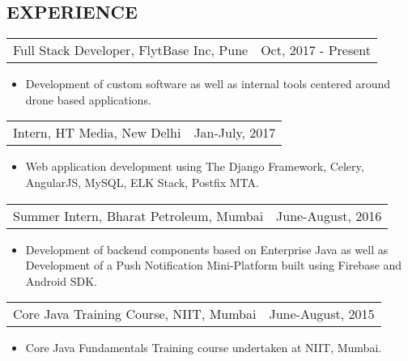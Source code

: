 \documentclass[margin]{res}
\begin{document}
\begin{resume}
\section{EXPERIENCE}      
                  \begin{tabular}{p{3in} r} %
                  Full Stack Developer, FlytBase Inc, Pune  & Oct, 2017 - Present
                  \end{tabular}	
                   \begin{itemize} %
                    \item[] Development of custom software as well as internal tools centered around drone based applications.
		   \end{itemize} 
		 \begin{tabular}{p{3in} r}
                  Intern, HT Media, New Delhi & Jan-July, 2017
                 \end{tabular}	
		  \begin{itemize}
                   \item[] Web application development using The Django Framework, Celery, AngularJS, MySQL, ELK Stack, Postfix MTA. 
                  \end{itemize}
                 \begin{tabular}{p{3in} r} %
                  Summer Intern, Bharat Petroleum, Mumbai &  June-August, 2016
                 \end{tabular}
                  \begin{itemize}
                   \item[] Development of backend components based on Enterprise Java as well as Development of a Push Notification Mini-Platform built using Firebase and Android SDK.
                  \end{itemize}
                 \begin{tabular}{p{3in} r} %
                  Core Java Training Course, NIIT, Mumbai & June-August, 2015
                 \end{tabular}
                  \begin{itemize}
                   \item[] Core Java Fundamentals Training course undertaken at NIIT, Mumbai.
                  \end{itemize}


\end{resume}
\end{document}
